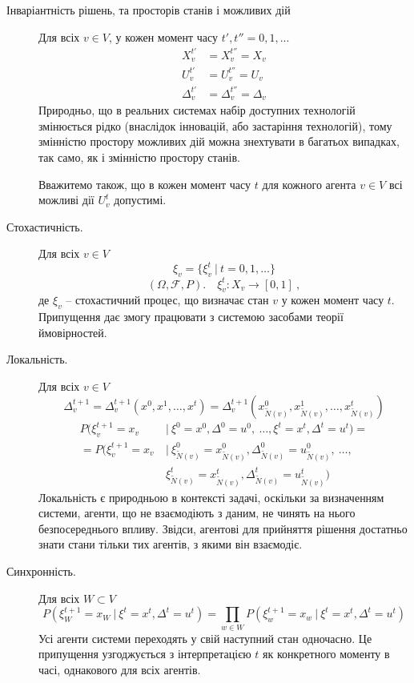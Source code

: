 \documentclass[oneside,draft,14pt]{extarticle}
\begin{document}
\begin{description}
    \item[Інваріантність рішень, та просторів станів і можливих дій] Для всіх \(v \in V\), у кожен момент часу \(t', t'' = 0, 1, ...\ \)
    \begin{align*}
      X_v^{t'} &= X_v^{t''} = X_v \\
      U_v^{t'} &= U_v^{t''} = U_v \\
	  \Delta_v^{t'} &= \Delta_v^{t''} = \Delta_v
    \end{align*}
	Природньо, що в реальних системах набір доступних технологій змінюється рідко (внаслідок інновацій, або застаріння технологій), тому змінністю простору можливих дій можна знехтувати в багатьох випадках, так само, як і змінністю простору станів.
	
	Вважитемо також, що в кожен момент часу \(t\) для кожного агента \(v \in V\) всі можливі дії \(U_v^t\) допустимі.

    \item[Стохастичність.] Для всіх \(v \in V\)
    \[ \xi_v = \{\xi^t_v\ |\ t = 0, 1, \ldots \}\] 
    \[ (\Omega, \mathcal{F}, P).\quad \xi_v^t : X_v \rightarrow [0, 1]\ ,\]
    де \( \xi_v \) – стохастичний процес, що визначає стан \(v\) у кожен момент часу \(t\). Припущення дає змогу працювати з системою засобами теорії ймовірностей.
    
    \item[Локальність.] Для всіх \(v \in V\) 
    \[\Delta_v^{t+1} = \Delta_v^{t+1}(x^0, x^1, \ldots, x^t) = \Delta_v^{t+1}(x_{\tilde{N}(v)}^0, x_{\tilde{N}(v)}^1, \ldots, x_{\tilde{N}(v)}^t)\]
    \begin{align*}
    P(\xi_v^{t+1} = x_v\ &|\ \xi^0 = x^0, \Delta^0 = u^0,\ \ldots, \xi^t = x^t, \Delta^t = u^t) = \\
	= P(\xi_v^{t+1} = x_v\ &|\ \xi_{\tilde N(v)}^0 = x_{\tilde N(v)}^0, \Delta_{\tilde N(v)}^0 = u_{\tilde N(v)}^0,\ \ldots,\\ &\xi_{\tilde N(v)}^t = x_{\tilde N(v)}^t, \Delta_{\tilde N(v)}^t = u_{\tilde N(v)}^t)
	\end{align*}
	Локальність є природньою в контексті задачі, оскільки за визначенням системи, агенти, що не взаємодіють з даним, не чинять на нього безпосереднього впливу. Звідси, агентові для прийняття рішення достатньо знати стани тільки тих агентів, з якими він взаємодіє.
	
    \item[Синхронність.] Для всіх \(W \subset V\)
     \[P(\xi^{t+1}_W = x_W\ |\ \xi^t = x^t, \Delta^t = u^t) = \prod_{w \in W} P(\xi^{t+1}_w = x_w\ |\ \xi^t = x^t, \Delta^t = u^t) \] Усі агенти системи переходять у свій наступний стан одночасно. Це припущення узгоджується з інтерпретацією \(t\) як конкретного моменту в часі, однакового для всіх агентів.
      

\end{description}
\end{document}
